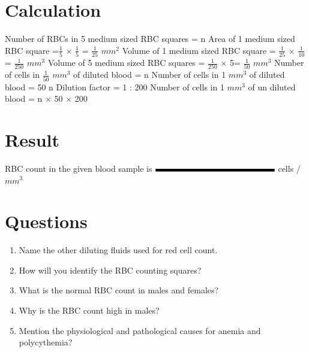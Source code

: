 \documentclass[a4paper,12pt]{book}
\begin{document}
					\section*{Calculation}
					Number of RBCs in 5 medium sized RBC squares = n\newline\vspace{.4cm}
					Area of 1 medium  sized RBC square =$\frac{1}{5}$ $\times$ $\frac{1}{5}$ = $\frac{1}{25}$ $mm^2$\newline\vspace{.4cm}
					Volume of 1 medium sized RBC square = $\frac{1}{25}$ $\times$ $\frac{1}{10}$ = $\frac{1}{250}$ $mm^3$\newline\vspace{.4cm}
					Volume of 5 medium sized RBC squares = $\frac{1}{250}$ $\times$ 5= $\frac{1}{50}$ $mm^3$\newline\vspace{.4cm}
					Number of cells in  $\frac{1}{50}$ $mm^3$ of diluted blood  = n\newline\vspace{.4cm}
					Number of cells in  1 $mm^3$  of diluted blood = 50 n\newline\vspace{.4cm}
					Dilution factor = 1 : 200\newline\vspace{.4cm}
					Number of cells in 1 $mm^3$ of un diluted blood 	= n $\times$ 50 $\times$ 200  \newline\vspace{.4cm}

					\section*{Result}
					RBC  count in the given  blood sample is $\rule{5cm}{0.1cm}$ cells / $mm^3$
					\section*{Questions}
					\begin{enumerate}

						\item {Name the other diluting fluids used for red  cell count.}
						\item{How will you identify the RBC counting squares?}
						\item{What is the normal RBC count in males and females?}
						\item{Why is the RBC count high in males?}
						\item{Mention the physiological and pathological causes for anemia and polycythemia?}


					\end{enumerate}
\end{document}
